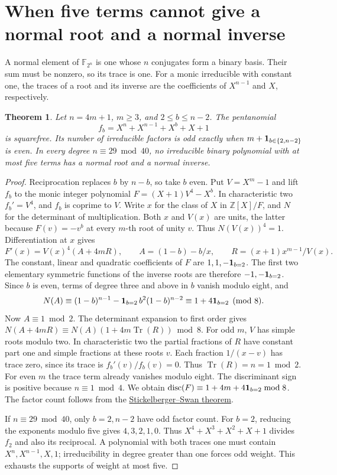 \documentclass[11pt]{article}
\newtheorem{theorem}{Theorem}
\begin{document}
\section{When five terms cannot give a normal root and a normal inverse}
\label{sec:endpoint-normal}
A normal element of \(\mathbb F_{2^n}\) is one whose \(n\) conjugates
form a binary basis. Their sum must be nonzero, so its trace is one.
For a monic irreducible with constant one, the traces of a root and
its inverse are the coefficients of \(X^{n-1}\) and \(X\), respectively.

\begin{theorem}\label{thm:endpoint-parity}
Let \(n=4m+1\), \(m\ge3\), and \(2\le b\le n-2\). The pentanomial
\[
 f_b=X^n+X^{n-1}+X^b+X+1
\]
is squarefree. Its number of irreducible factors is odd exactly when
\(m+{\bf1}_{b\in\{2,n-2\}}\) is even.
In every degree \(n\equiv29\bmod40\), no irreducible binary polynomial
with at most five terms has a normal root and a normal inverse.
\end{theorem}
\begin{proof}
Reciprocation replaces \(b\) by \(n-b\), so take \(b\) even.
Put \(V=X^m-1\) and lift \(f_b\) to the monic integer polynomial
\(F=(X+1)V^4-X^b\). In characteristic two \(f_b'=V^4\), and \(f_b\)
is coprime to \(V\). Write \(x\) for the class of \(X\) in
\(\mathbb Z[X]/F\), and \(N\) for the determinant of multiplication.
Both \(x\) and \(V(x)\) are units, the latter because \(F(v)=-v^b\)
at every \(m\)-th root of unity \(v\). Thus \(N(V(x))^4=1\).
Differentiation at \(x\) gives
\[
 F'(x)=V(x)^4(A+4mR),\qquad
 A=(1-b)-b/x,\qquad R=(x+1)x^{m-1}/V(x).
\]
The constant, linear and quadratic coefficients of \(F\) are
\(1,1,-{\bf1}_{b=2}\). The first two elementary symmetric functions
of the inverse roots are therefore \(-1,-{\bf1}_{b=2}\). Since \(b\)
is even, terms of degree three and above in \(b\) vanish modulo eight,
and
\[
 N(A)\equiv(1-b)^{n-1}
 -{\bf1}_{b=2}\,b^2(1-b)^{n-2}\equiv 1+4{\bf1}_{b=2}\pmod8.
\]
Now \(A\equiv1\bmod2\). The determinant expansion to first order gives
\(N(A+4mR)\equiv N(A)(1+4m\operatorname{Tr}(R))\bmod8\).
For odd \(m\), \(V\) has simple roots modulo two. In characteristic
two the partial fractions of \(R\) have constant part one and simple
fractions at these roots \(v\). Each fraction \(1/(x-v)\) has trace
zero, since its trace is \(f_b'(v)/f_b(v)=0\). Thus
\(\operatorname{Tr}(R)=n=1\bmod2\). For even \(m\) the trace term
already vanishes modulo eight. The discriminant sign is positive
because \(n\equiv1\bmod4\). We obtain
\(\operatorname{disc}(F)\equiv1+4m+4{\bf1}_{b=2}\bmod8\).
The factor count follows from the
\href{https://doi.org/10.2140/pjm.1962.12.1099}{Stickelberger--Swan theorem}.

If \(n\equiv29\bmod40\), only \(b=2,n-2\) have odd factor count.
For \(b=2\), reducing the exponents modulo five gives \(4,3,2,1,0\).
Thus \(X^4+X^3+X^2+X+1\) divides \(f_2\) and also its reciprocal.
A polynomial with both traces one must contain \(X^n,X^{n-1},X,1\);
irreducibility in degree greater than one forces odd weight.
This exhausts the supports of weight at most five.
\end{proof}
\end{document}
